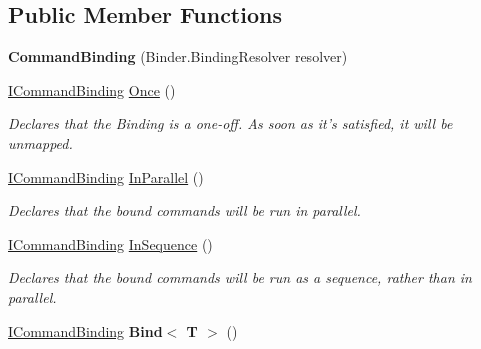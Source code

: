 \subsection*{Public Member Functions}
\begin{DoxyCompactItemize}
\item 
\hypertarget{classstrange_1_1extensions_1_1command_1_1impl_1_1_command_binding_a2363022e91a8f9f676d20c87bc3944e3}{{\bfseries Command\-Binding} (Binder.\-Binding\-Resolver resolver)}\label{classstrange_1_1extensions_1_1command_1_1impl_1_1_command_binding_a2363022e91a8f9f676d20c87bc3944e3}

\item 
\hypertarget{classstrange_1_1extensions_1_1command_1_1impl_1_1_command_binding_a8e9748be1b68811006095c2b91b226f6}{\hyperlink{interfacestrange_1_1extensions_1_1command_1_1api_1_1_i_command_binding}{I\-Command\-Binding} \hyperlink{classstrange_1_1extensions_1_1command_1_1impl_1_1_command_binding_a8e9748be1b68811006095c2b91b226f6}{Once} ()}\label{classstrange_1_1extensions_1_1command_1_1impl_1_1_command_binding_a8e9748be1b68811006095c2b91b226f6}

\begin{DoxyCompactList}\small\item\em Declares that the Binding is a one-\/off. As soon as it's satisfied, it will be unmapped. \end{DoxyCompactList}\item 
\hyperlink{interfacestrange_1_1extensions_1_1command_1_1api_1_1_i_command_binding}{I\-Command\-Binding} \hyperlink{classstrange_1_1extensions_1_1command_1_1impl_1_1_command_binding_a25ea62fb08609aaba172f2c1c8c6efa6}{In\-Parallel} ()
\begin{DoxyCompactList}\small\item\em Declares that the bound commands will be run in parallel. \end{DoxyCompactList}\item 
\hypertarget{classstrange_1_1extensions_1_1command_1_1impl_1_1_command_binding_a9969c6ea7325cd974a80383f800f92dd}{\hyperlink{interfacestrange_1_1extensions_1_1command_1_1api_1_1_i_command_binding}{I\-Command\-Binding} \hyperlink{classstrange_1_1extensions_1_1command_1_1impl_1_1_command_binding_a9969c6ea7325cd974a80383f800f92dd}{In\-Sequence} ()}\label{classstrange_1_1extensions_1_1command_1_1impl_1_1_command_binding_a9969c6ea7325cd974a80383f800f92dd}

\begin{DoxyCompactList}\small\item\em Declares that the bound commands will be run as a sequence, rather than in parallel. \end{DoxyCompactList}\item 
\hypertarget{classstrange_1_1extensions_1_1command_1_1impl_1_1_command_binding_ad71805e2d0c3194b533300494b13f0d1}{\hyperlink{interfacestrange_1_1extensions_1_1command_1_1api_1_1_i_command_binding}{I\-Command\-Binding} {\bfseries Bind$<$ T $>$} ()}\label{classstrange_1_1extensions_1_1command_1_1impl_1_1_command_binding_ad71805e2d0c3194b533300494b13f0d1}


\end{DoxyCompactItemize}
